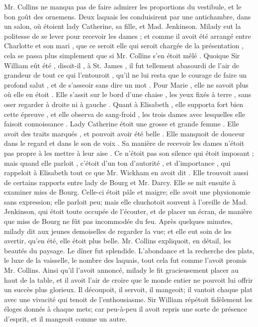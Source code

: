 Mr. Collins ne manqua pas de faire admirer les proportions du vestibule, et le bon goût des ornemens. Deux laquais les conduisirent par une antichambre, dans un salon, où étoient lady Catherine, sa fille, et Mad. Jenkinson. Milady eut la politesse de\setcounter{page}{531} se lever pour recevoir les dames ; et comme il avoit été arrangé entre Charlotte et son mari , que ce seroit elle qui seroit chargée de la présentation , cela se passa plus simplement que si Mr. Collins s'en étoit mêlé .
Quoique Sir William eût été , disoit-il , à St. James , il fut tellement abasourdi de l'air de grandeur de tout ce qui l'entouroit , qu'il ne lui resta que le courage de faire un profond salut , et de s'asseoir sans dire un mot .
Pour Marie , elle ne savoit plus où elle en étoit . Elle s'assit sur le bord d'une chaise , les yeux fixés à terre , sans oser regarder à droite ni à gauche . Quant à Elisabeth , elle supporta fort bien cette épreuve , et elle observa de sang-froid , les trois dames avec lesquelles elle faisoit connoissance . Lady Catherine étoit une grosse et grande femme . Elle avoit des traits marqués , et pouvoit avoir été belle . Elle manquoit de douceur dans le regard et dans le son de voix . Sa manière de recevoir les dames n'étoit pas propre à les mettre à leur aise . Ce n'étoit pas son silence qui étoit imposant ; mais quand elle parloit , c'étoit d'un ton d'autorité , et d'importance , qui rappeloit à Elisabeth tout ce que Mr. Wickham en avoit dit . Elle trouvoit aussi de certains rapports entre lady de Bourg et Mr. Darcy.
\setcounter{page}{532}
Elle se mit ensuite à examiner miss de Bourg. Celle-ci étoit pâle et maigre; elle avoit une physionomie sans expression; elle parloit peu; mais elle chuchotoit souvent à l'oreille de Mad. Jenkinson, qui étoit toute occupée de l'écouter, et de placer un écran, de manière que miss de Bourg ne fût pas incommodée du feu.
Après quelques minutes, milady dit aux jeunes demoiselles de regarder la vue; et elle eut soin de les avertir, qu'en été, elle étoit plus belle. Mr. Collins expliquoit, en détail, les beautés du paysage.
Le dîner fut splendide. L'abondance et la recherche des plats, le luxe de la vaisselle, le nombre des laquais, tout cela fut comme l'avoit promis Mr. Collins. Ainsi qu'il l'avoit annoncé, milady le fit gracieusement placer au haut de la table, et il avoit l'air de croire que le monde entier ne pouvoit lui offrir un succès plus glorieux. Il découpoit, il servoit, il mangeoit; il vantoit chaque plat avec une vivacité qui tenoit de l'enthousiasme. Sir William répétoit fidèlement les éloges donnés à chaque mets; car peu-à-peu il avoit repris une sorte de présence d'esprit, et il mangeoit comme un autre.
